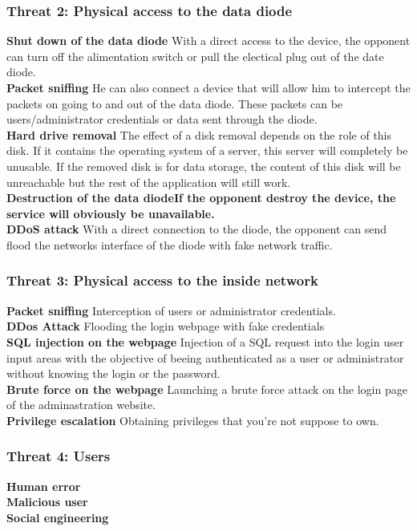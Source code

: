 \documentclass[a4paper,11pt]{article}
\begin{document}
\subsubsection{Threat 2: Physical access to the data diode}
\textbf{Shut down of the data diode} With a direct access to the device, the opponent can turn off the alimentation switch or pull the electical plug out of the date diode.\\
\textbf{Packet sniffing} He can also connect a device that will allow him to intercept the packets on going to and out of the data diode. These packets can be users/administrator credentials or data sent through the diode.\\
\textbf{Hard drive removal} The effect of a disk removal depends on the role of this disk. If it contains the operating system of a server, this server will completely be unusable. If the removed disk is for data storage, the content of this disk will be unreachable but the rest of the application will still work.\\
\textbf{Destruction of the data diodeIf the opponent destroy the device, the service will obviously be unavailable.}\\
\textbf{DDoS attack} With a direct connection to the diode, the opponent can send flood the networks interface of the diode with fake network traffic.\\ 
\subsubsection{Threat 3: Physical access to the inside network }
\textbf{Packet sniffing} Interception of users or administrator credentials. \\
\textbf{DDos Attack} Flooding the login webpage with fake credentials \\
\textbf{SQL injection on the webpage} Injection of a SQL request into the login user input areas with the objective of beeing authenticated as a user or administrator without knowing the login or the password. \\
\textbf{Brute force on the webpage} Launching a brute force attack on the login page of the adminastration website.\\
\textbf{Privilege escalation} Obtaining privileges that you're not suppose to own.\\
\subsubsection{Threat 4: Users}
\textbf{Human error} \\
\textbf{Malicious user}\\
\textbf{Social engineering}\\
\end{document}
